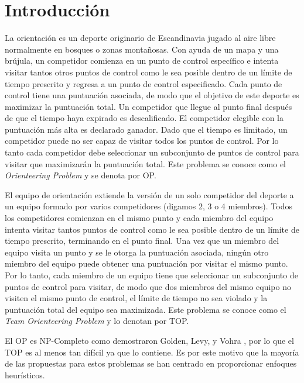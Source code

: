 \chapter{Introducción}

La orientación \cite{ChaoGoldenWasil} es un deporte originario de Escandinavia jugado al aire libre normalmente en bosques o zonas montañosas. Con ayuda de un mapa y una brújula, un competidor comienza en un punto de control específico e intenta visitar tantos otros puntos de control como le sea posible dentro de un límite de tiempo prescrito y regresa a un punto de control especificado. Cada punto de control tiene una puntuación asociada, de modo que el objetivo de este deporte es maximizar la puntuación total. Un competidor que llegue al punto final después de que el tiempo haya expirado es descalificado. El competidor elegible con la puntuación más alta es declarado ganador. Dado que el tiempo es limitado, un competidor puede no ser capaz de visitar todos los puntos de control. Por lo tanto cada competidor debe seleccionar un subconjunto de puntos de control para visitar que maximizarán la puntuación total. Este problema se conoce como el \textit{Orienteering Problem} y se denota por OP.

\bigskip

El equipo de orientación extiende la versión de un solo competidor del deporte a un equipo formado por varios competidores (digamos 2, 3 o 4 miembros). Todos los competidores comienzan en el mismo punto y cada miembro del equipo intenta visitar tantos puntos de control como le sea posible dentro de un límite de tiempo prescrito, terminando en el punto final. Una vez que un miembro del equipo visita un punto y se le otorga la puntuación asociada, ningún otro miembro del equipo puede obtener una puntuación por visitar el mismo punto. Por lo tanto, cada miembro de un equipo tiene que seleccionar un subconjunto de puntos de control para visitar, de modo que dos miembros del mismo equipo no visiten el mismo punto de control, el límite de tiempo no sea violado y la puntuación total del equipo sea maximizada. Este problema se conoce como el \textit{Team Orienteering Problem} y lo denotan por TOP.

\bigskip

El OP es NP-Completo como demostraron Golden, Levy, y Vohra \cite{GoldenLevyVohra}, por lo que el TOP es al menos tan difícil ya que lo contiene. Es por este motivo que la mayoría de las propuestas para estos problemas se han centrado en proporcionar enfoques heurísticos.

